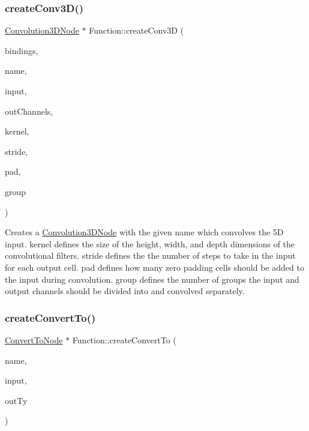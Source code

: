 \subsubsection{\texorpdfstring{create\+Conv3\+D()}{createConv3D()}\hspace{0.1cm}{\footnotesize\ttfamily [4/4]}}
{\footnotesize\ttfamily \hyperlink{classglow_1_1_convolution3_d_node}{Convolution3\+D\+Node} $\ast$ Function\+::create\+Conv3D (\begin{DoxyParamCaption}\item[{\hyperlink{classglow_1_1_placeholder_bindings}{Placeholder\+Bindings} \&}]{bindings,  }\item[{llvm\+::\+String\+Ref}]{name,  }\item[{\hyperlink{structglow_1_1_node_value}{Node\+Value}}]{input,  }\item[{size\+\_\+t}]{out\+Channels,  }\item[{\hyperlink{namespaceglow_a0ca574644e1e42ef193a9947fb4d8911}{unsigned\+\_\+t}}]{kernel,  }\item[{\hyperlink{namespaceglow_a0ca574644e1e42ef193a9947fb4d8911}{unsigned\+\_\+t}}]{stride,  }\item[{\hyperlink{namespaceglow_a0ca574644e1e42ef193a9947fb4d8911}{unsigned\+\_\+t}}]{pad,  }\item[{\hyperlink{namespaceglow_a0ca574644e1e42ef193a9947fb4d8911}{unsigned\+\_\+t}}]{group }\end{DoxyParamCaption})}

Creates a \hyperlink{classglow_1_1_convolution3_d_node}{Convolution3\+D\+Node} with the given {\ttfamily name} which convolves the 5D {\ttfamily input}. {\ttfamily kernel} defines the size of the height, width, and depth dimensions of the convolutional filters. {\ttfamily stride} defines the the number of steps to take in the input for each output cell. {\ttfamily pad} defines how many zero padding cells should be added to the input during convolution. {\ttfamily group} defines the number of groups the input and output channels should be divided into and convolved separately. \mbox{\label{classglow_1_1_function_afb186d99df71f01dc37871b7a91fe207}} 
\subsubsection{\texorpdfstring{create\+Convert\+To()}{createConvertTo()}\hspace{0.1cm}{\footnotesize\ttfamily [1/2]}}
{\footnotesize\ttfamily \hyperlink{classglow_1_1_convert_to_node}{Convert\+To\+Node} $\ast$ Function\+::create\+Convert\+To (\begin{DoxyParamCaption}\item[{llvm\+::\+String\+Ref}]{name,  }\item[{\hyperlink{structglow_1_1_node_value}{Node\+Value}}]{input,  }\item[{\hyperlink{structglow_1_1_type}{Type\+Ref}}]{out\+Ty }\end{DoxyParamCaption})}

